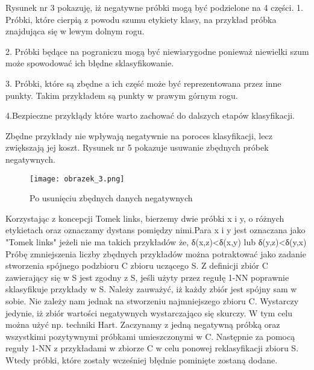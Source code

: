 \documentclass{article}
\begin{document}
\begin{itemize}
    \break
    Rysunek nr 3 pokazuję, iż negatywne próbki mogą być podzielone na 4 części.
    1. Próbki, które cierpią z powodu szumu etykiety klasy, na przykład próbka znajdująca się w lewym dolnym rogu.
    \newline

    2. Próbki będące na pograniczu mogą być niewiarygodne ponieważ niewielki szum może spowodować ich błędne sklasyfikowanie.
    \newline
    
    3. Próbki, które są zbędne a ich część może być reprezentowana przez inne punkty. Takim przykładem są punkty w prawym górnym rogu.
    \newline
  
    4.Bezpieczne przykłądy które warto zachować do dalszych etapów klasyfikacji.
    \newline

    Zbędne przykłady nie wpływają negatywnie na poroces klasyfikacji, lecz zwiększają jej koszt. Rysunek nr 5 pokazuje usuwanie zbędnych próbek negatywnych.
    \newline

    
    \begin{figure}[h!]
\texttt{[image: obrazek\_3.png]}
\caption{Po usunięciu zbędnych danych negatywnych} 
\label{fig:obrazek_2}
\end{figure}
    \break
    Korzystając z koncepcji Tomek links, bierzemy dwie  próbki x i y, o różnych etykietach oraz oznaczamy dystans pomiędzy nimi.Para x i y jest oznaczana jako  "Tomek links" jeżeli nie ma takich przykładów że, \newline
    δ(x,z)<δ(x,y) lub δ(y,z)<δ(y,x)\newline
    Próbę zmniejszenia liczby zbędnych przykładów można potraktować jako zadanie stworzenia spójnego podzbioru C zbioru uczącego S. Z definicji zbiór C zawierający się w S jest zgodny z S, jeśli użyty przez regułę 1-NN poprawnie sklasyfikuje przykłady w S. Należy zauważyć, iż każdy zbiór jest spójny sam w sobie. Nie zależy nam jednak na stworzeniu najmniejszego zbioru C. Wystarczy jedynie, iż zbiór wartości negatywnych wystarczająco się skurczy. W tym celu można użyć np. techniki Hart. Zaczynamy z jedną negatywną próbką oraz wszystkimi pozytywnymi próbkami umieszczonymi w C. Następnie za pomocą reguły 1-NN z przykładami w zbiorze C w celu ponowej reklasyfikacji zbioru S. Wtedy próbki, które zostały wcześniej błędnie pominięte zostaną dodane.\newline
    


\end{itemize}
\end{document}

